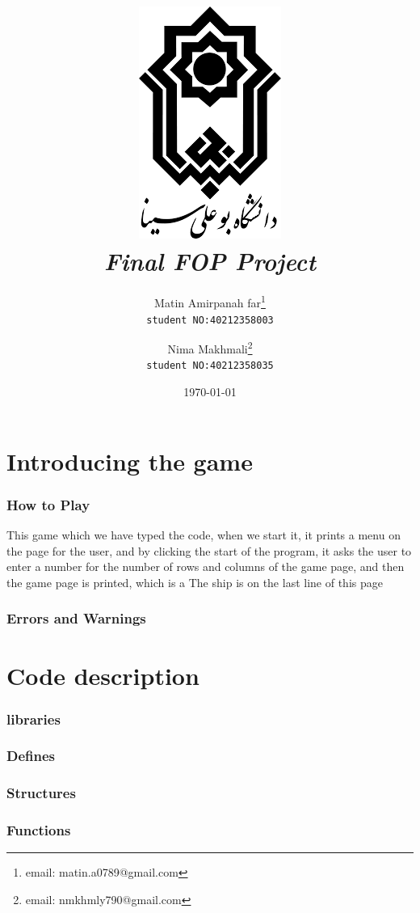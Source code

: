 \documentclass[12pt,a4paper]{article}
\title{\includegraphics[scale=0.5]{Graphics/BASU_Logo_header.png}\\[20pt] {\Huge \emph{Final FOP Project}}}
\author{Matin Amirpanah far\thanks{email: matin.a0789@gmail.com}\\
	\texttt{student NO:40212358003}\and
	Nima Makhmali\thanks{email: nmkhmly790@gmail.com}\\ \texttt{student NO:40212358035}}
\date{\today}
\begin{document}
	
	\maketitle
	
	\newpage
	\tableofcontents
	
	\newpage
	\setcounter{section}{0}
	\part{Introducing the game}\label{introducing}
        	
	\section{How to Play}\label{introducing.how}
	  This game which we have typed the code, when we start it, it prints a menu on the page for the user, and by clicking the start of the program, it asks the user to enter a number for the number of rows and columns of the game page, and then the game page is printed, which is a The ship is on the last line of this page
	\section{Errors and Warnings}\label{introducing.errors}
	
	
	\newpage
	\setcounter{section}{0}
	\part{Code description}\label{description}
	
	\section{libraries}\label{description.libraries}
	
	\section{Defines}\label{description.defines}
	
	\section{Structures}\label{description.structs}
	
	\section{Functions}\label{description.func}
	
\end{document}
